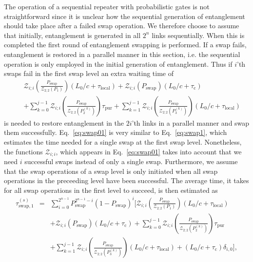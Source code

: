 The operation of a sequential repeater with probabilistic gates is not
straightforward since it is unclear how the sequential generation of
entanglement should take place after a failed swap operation. We therefore
choose to assume that initially, entanglement is generated in all $2^{n}$ links
sequentially. When this is completed the first round of entanglement swapping is
performed. If a swap fails, entanglement is restored in a parallel manner in
this section, i.e. the sequential operation is only employed in the initial
generation of entanglement. Thus if $i$'th swaps fail in the first swap level an
extra waiting time of
\begin{eqnarray} \label{eq:swap01}
&&\mathcal{Z}_{i;i}\left(\frac{P_{\text{swap}}}
{\mathcal{Z}_{2;2}(P_{1})}\right)(L_{0}/c+\tau_{\text{local}}) 
+\mathcal{Z}_{i;i}(P_{\text{swap}})(L_{0}/c+\tau_{\text{c}}) \nonumber \\
&&+\sum_{k=0}^{j-1}\mathcal{Z}_{i;i}
\left(\frac{P_{\text{swap}}}{\mathcal{Z}_{2;2}(P_{2}^{(k)})}
\right)\tau_{\text{pur}} 
+\sum_{k=1}^{j-1}\mathcal{Z}_{i;i}
\left(\frac{P_{\text{swap}}}{\mathcal{Z}_{2;2}(P_{3}^{(k)})}
\right)(L_{0}/c+\tau_{\text{local}})
\end{eqnarray}
is needed to restore entanglement in the $2i$'th links in a parallel manner and
swap them successfully. Eq.~\eqref{eq:swap01} is very similar to
Eq.~\eqref{eq:swap1}, which estimates the time needed for a single swap at the
first swap level. Nonetheless, the functions $\mathcal{Z}_{i;i}$, which appears
in Eq.~\eqref{eq:swap01} takes into account that we need $i$ successful swaps
instead of only a single swap.
Furthermore, we assume that the swap operations of a swap level is only
initiated when all swap operations in the preceeding level have been successful.
The average time, it takes for all swap operations in the first level to
succeed, is then estimated as
\begin{eqnarray} \label{eq:seq1}
\tau^{(s)}_{\text{swap},1}&=&\sum_{i=0}^{2^{n-1}}
P_{\text{swap}}^{2^{n-1}-i}(1-P_{\text{swap}})^{i}\Bigg[ 
 \mathcal{Z}_{i;i}\left(\frac{P_{\text{swap}}}
{\mathcal{Z}_{2;2}(P_{1})}\right)(L_{0}/c+\tau_{\text{local}}) \nonumber \\
&&+\mathcal{Z}_{i;i}(P_{\text{swap}})(L_{0}/c+\tau_{\text{c}}) 
+\sum_{k=0}^{j-1}\mathcal{Z}_{i;i} \left(\frac{P_{\text{swap}}}
{\mathcal{Z}_{2;2}(P_{2}^{(k)})} \right)\tau_{\text{pur}} \nonumber \\
&&+\sum_{k=1}^{j-1}\mathcal{Z}_{i;i}
\left(\frac{P_{\text{swap}}}{\mathcal{Z}_{2;2}(P_{3}^{(k)})}
\right)(L_{0}/c+\tau_{\text{local}})  +(L_{0}/c+\tau_{\text{c}})\delta_{i,0}
\Bigg],
\end{eqnarray}
